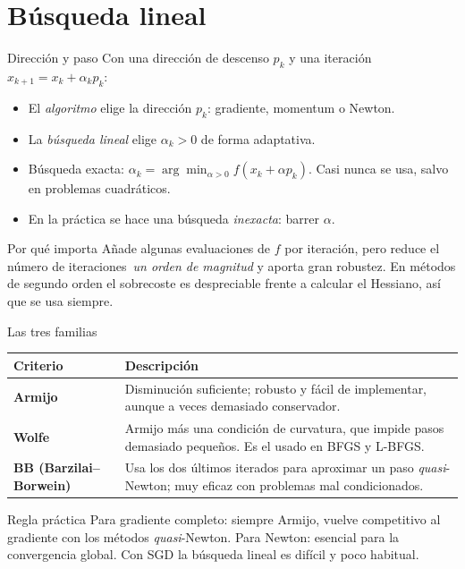 \documentclass[10pt,aspectratio=169]{beamer}
\begin{document}
\section{Búsqueda lineal}

\begin{frame}{Dirección y paso}
  \small
  Con una dirección de descenso $p_k$ y una iteración $x_{k+1}=x_k+\alpha_k p_k$:
  \begin{itemize}
    \item El \emph{algoritmo} elige la dirección $p_k$:
      gradiente, momentum o Newton.
    \item La \emph{búsqueda lineal} elige $\alpha_k>0$ de forma adaptativa.
    \item Búsqueda exacta: $\alpha_k=\arg\min_{\alpha>0}f(x_k+\alpha p_k)$.
      Casi nunca se usa, salvo en problemas cuadráticos.
    \item En la práctica se hace una búsqueda \emph{inexacta}: barrer $\alpha$.
  \end{itemize}
  \vfill
  \begin{block}{Por qué importa}
    Añade algunas evaluaciones de $f$ por iteración, pero reduce el número de
    iteraciones~\emph{un orden de magnitud} y aporta gran robustez.
    En métodos de segundo orden el sobrecoste es despreciable frente a calcular
    el Hessiano, así que se usa siempre.
  \end{block}
\end{frame}

\begin{frame}{Las tres familias}
  \small
  \begin{tabularx}{\textwidth}{@{}>{\bfseries}l X@{}}
    \toprule
    Criterio & Descripción \\
    \midrule
    Armijo & Disminución suficiente; robusto y fácil de implementar, aunque a
      veces demasiado conservador. \\
    Wolfe & Armijo más una condición de curvatura, que impide pasos demasiado
      pequeños. Es el usado en BFGS y L-BFGS. \\
    BB (Barzilai--Borwein) & Usa los dos últimos iterados para aproximar un paso
      \emph{quasi}-Newton; muy eficaz con problemas mal condicionados. \\
    \bottomrule
  \end{tabularx}
  \vfill
  \begin{block}{Regla práctica}
    Para gradiente completo: siempre Armijo, vuelve competitivo al gradiente
    con los métodos \emph{quasi}-Newton. Para Newton: esencial para la convergencia
    global. Con SGD la búsqueda lineal es difícil y poco habitual.
  \end{block}
\end{frame}
\end{document}
